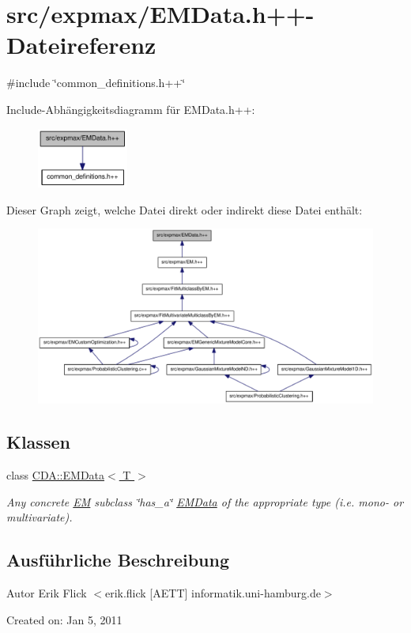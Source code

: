 \hypertarget{EMData_8h_09_09}{
\section{src/expmax/EMData.h++-\/Dateireferenz}
\label{EMData_8h_09_09}
}
{\ttfamily \#include \char`\"{}common\_\-definitions.h++\char`\"{}}\par
Include-\/Abhängigkeitsdiagramm für EMData.h++:\nopagebreak
\begin{figure}[H]
\begin{center}
\leavevmode
\includegraphics[width=85pt]{EMData_8h_09_09__incl}
\end{center}
\end{figure}
Dieser Graph zeigt, welche Datei direkt oder indirekt diese Datei enthält:\nopagebreak
\begin{figure}[H]
\begin{center}
\leavevmode
\includegraphics[width=380pt]{EMData_8h_09_09__dep__incl}
\end{center}
\end{figure}
\subsection*{Klassen}
\begin{DoxyCompactItemize}
\item 
class \hyperlink{classCDA_1_1EMData}{CDA::EMData$<$ T $>$}
\begin{DoxyCompactList}\small\item\em Any concrete \hyperlink{classCDA_1_1EM}{EM} subclass \char`\"{}has\_\-a\char`\"{} \hyperlink{classCDA_1_1EMData}{EMData} of the appropriate type (i.e. mono-\/ or multivariate). \item\end{DoxyCompactList}\end{DoxyCompactItemize}


\subsection{Ausführliche Beschreibung}
\begin{DoxyAuthor}{Autor}
Erik Flick $<$erik.flick \mbox{[}AETT\mbox{]} informatik.uni-\/hamburg.de$>$
\end{DoxyAuthor}
Created on: Jan 5, 2011 